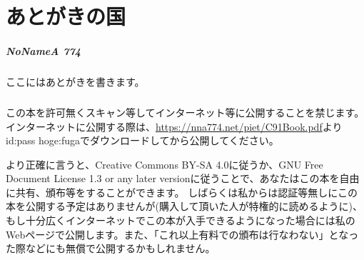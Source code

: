 \chapter[あとがきの国]{あとがきの国}

\paragraph{NoNameA 774}

ここにはあとがきを書きます。

\paragraph{}

この本を許可無くスキャン等してインターネット等に公開することを禁じます。
インターネットに公開する際は、\url{https://nna774.net/piet/C91Book.pdf}よりid:pass hoge:fugaでダウンロードしてから公開してください。

より正確に言うと、Creative Commons BY-SA 4.0に従うか、GNU Free Document License 1.3 or any later versionに従うことで、あなたはこの本を自由に共有、頒布等をすることができます。
しばらくは私からは認証等無しにこの本を公開する予定はありませんが(購入して頂いた人が特権的に読めるように)、もし十分広くインターネットでこの本が入手できるようになった場合には私のWebページで公開します。また、「これ以上有料での頒布は行なわない」となった際などにも無償で公開するかもしれません。
